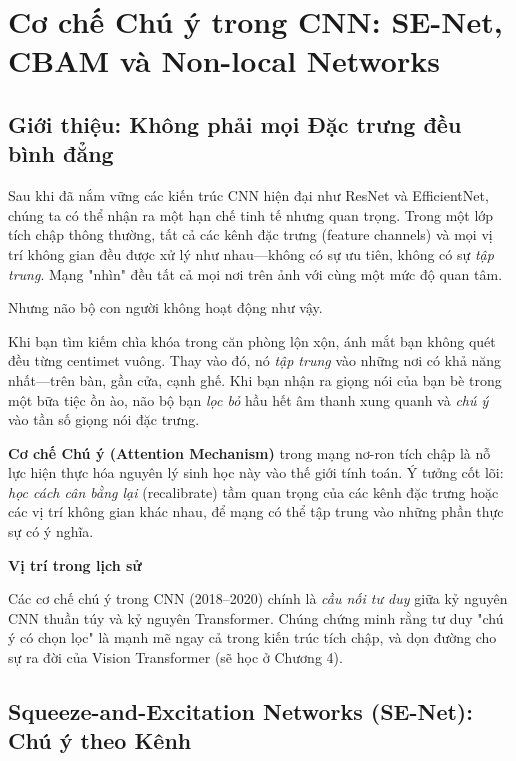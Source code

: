 \section{Cơ chế Chú ý trong CNN: SE-Net, CBAM và Non-local Networks}
\label{sec:attention_in_cnn}

\subsection{Giới thiệu: Không phải mọi Đặc trưng đều bình đẳng}
\label{subsec:attention_intro}

Sau khi đã nắm vững các kiến trúc CNN hiện đại như ResNet và EfficientNet, chúng ta có thể nhận ra một hạn chế tinh tế nhưng quan trọng. Trong một lớp tích chập thông thường, tất cả các kênh đặc trưng (feature channels) và mọi vị trí không gian đều được xử lý như nhau—không có sự ưu tiên, không có sự \textit{tập trung}. Mạng "nhìn" đều tất cả mọi nơi trên ảnh với cùng một mức độ quan tâm.

Nhưng não bộ con người không hoạt động như vậy.

Khi bạn tìm kiếm chìa khóa trong căn phòng lộn xộn, ánh mắt bạn không quét đều từng centimet vuông. Thay vào đó, nó \textit{tập trung} vào những nơi có khả năng nhất—trên bàn, gần cửa, cạnh ghế. Khi bạn nhận ra giọng nói của bạn bè trong một bữa tiệc ồn ào, não bộ bạn \textit{lọc bỏ} hầu hết âm thanh xung quanh và \textit{chú ý} vào tần số giọng nói đặc trưng.

\textbf{Cơ chế Chú ý (Attention Mechanism)} trong mạng nơ-ron tích chập là nỗ lực hiện thực hóa nguyên lý sinh học này vào thế giới tính toán. Ý tưởng cốt lõi: \textit{học cách cân bằng lại} (recalibrate) tầm quan trọng của các kênh đặc trưng hoặc các vị trí không gian khác nhau, để mạng có thể tập trung vào những phần thực sự có ý nghĩa.

\begin{mdframed}[style=infobox]
    \textbf{Vị trí trong lịch sử}

    Các cơ chế chú ý trong CNN (2018--2020) chính là \textit{cầu nối tư duy} giữa kỷ nguyên CNN thuần túy và kỷ nguyên Transformer. Chúng chứng minh rằng tư duy "chú ý có chọn lọc" là mạnh mẽ ngay cả trong kiến trúc tích chập, và dọn đường cho sự ra đời của Vision Transformer (sẽ học ở Chương 4).
\end{mdframed}

\subsection{Squeeze-and-Excitation Networks (SE-Net): Chú ý theo Kênh}
\label{subsec:senet}

